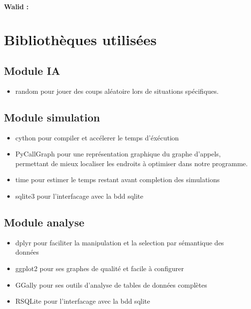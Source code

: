 				\paragraph{Walid :}
			
			\section{Bibliothèques utilisées}
				\subsection{Module IA}
				
				\begin{itemize}
					\item random pour jouer des coups aléatoire lors de situations spécifiques.
				\end{itemize}
			
				\subsection{Module simulation}
				
				\begin{itemize}
					\item cython pour compiler et accélerer le temps d'éxécution
					\item PyCallGraph pour une représentation graphique du graphe d'appels, permettant de mieux localiser les endroits à optimiser dans notre programme.
					\item time pour estimer le temps restant avant completion des simulations
					\item sqlite3 pour l'interfacage avec la bdd sqlite
				\end{itemize}
			
				\subsection{Module analyse}
				
				\begin{itemize}
					\item dplyr pour faciliter la manipulation et la selection par sémantique des données
					\item ggplot2 pour ses graphes de qualité et facile à configurer
					\item GGally pour ses outils d'analyse de tables de données complètes
					\item RSQLite pour l'interfacage avec la bdd sqlite
				\end{itemize}